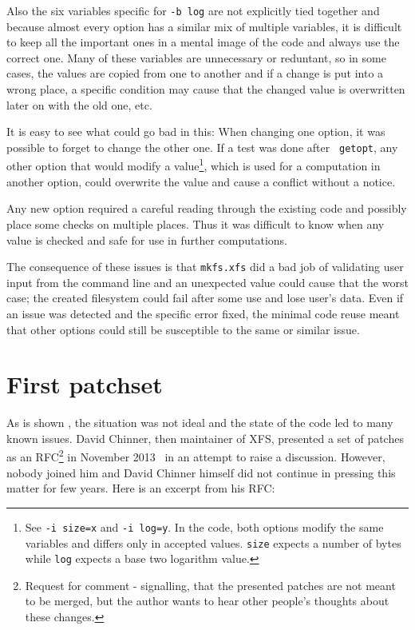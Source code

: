 \begin{desciption}
Also the six variables specific for {\tt -b log} are not explicitly tied
together and because almost every option has a similar mix of multiple
variables, it is difficult to keep all the important ones in a mental image
of the code and always use the correct one. Many of these variables are
unnecessary or reduntant, so in some cases, the values are copied from one
to another and if a change is put into a wrong place, a specific condition
may cause that the changed value is overwritten later on with the old one,
etc.

It is easy to see what could go bad in this: When changing one option, it was
possible to forget to change the other one. If a test was done after {\tt
getopt}, any other option that would modify a value\footnote{See {\tt -i
size=x} and {\tt -i log=y}. In the code, both options modify the same variables
and differs only in accepted values. {\tt size} expects a number of bytes while
{\tt log} expects a base two logarithm value.}, which is used for a computation
in another option, could overwrite the value and cause a conflict without a
notice.

Any new option required a careful reading through the existing code and
possibly place some checks on multiple places. Thus it was difficult to know
when any value is checked and safe for use in further computations.


The consequence of these issues is that {\tt mkfs.xfs} did a bad job of
validating user input from the command line and an unexpected value could
cause that the worst case; the created filesystem could fail after some use
and lose user's data. Even if an issue was detected and the specific
error fixed, the minimal code reuse meant that other options could still be
susceptible to the same or similar issue.

\section{First patchset}\label{chap:refactoring:first}

As is shown , the situation was not ideal and the
state of the code led to many known issues. David Chinner, then maintainer
of XFS, presented a set of patches as an RFC\footnote{Request for comment -
	signalling, that the presented patches are not meant to be merged,
but the author wants to hear other people's thoughts about these changes.}
in November 2013~\cite{davidsPatches} in an attempt to raise a discussion.
However, nobody joined him and David Chinner himself did not continue in
pressing this matter for few years. Here is an excerpt from his RFC:


\end{desciption}
